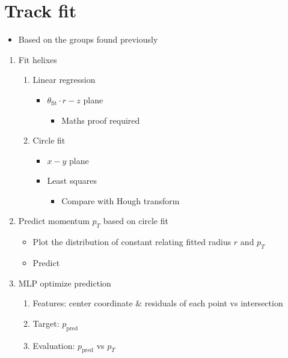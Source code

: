 \documentclass{article}
\begin{document}
\section{Track fit}
\begin{itemize}
  \item Based on the groups found previously
\end{itemize}
\begin{enumerate}
\item Fit helixes
  \begin{enumerate}
    \item Linear regression
      \begin{itemize}
        \item $\theta_{\text{fit}} \cdot r-z$ plane
          \begin{itemize}
            \item Maths proof required
          \end{itemize}
      \end{itemize}
    \item Circle fit
      \begin{itemize}
        \item $x-y$ plane
        \item Least squares
          \begin{itemize}
            \item Compare with Hough transform
          \end{itemize}
      \end{itemize}
  \end{enumerate}
\item Predict momentum $p_T$ based on circle fit
  \begin{itemize}
    \item Plot the distribution of constant relating fitted radius $r$ and $p_T$
    \item Predict
  \end{itemize}
\item MLP optimize prediction
  \begin{enumerate}
    \item Features: center coordinate \& residuals of each point vs intersection
    \item Target:  $p_{\text{pred}}$
    \item Evaluation:  $p_{\text{pred}}$ vs $p_T$
  \end{enumerate}
\end{enumerate}
\end{document}

